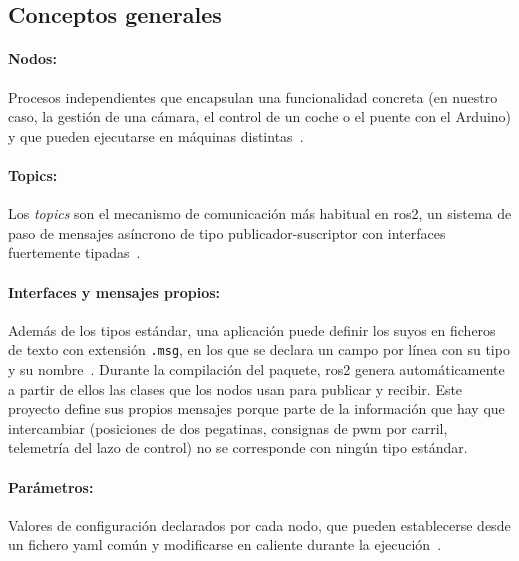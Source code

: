 \subsection{Conceptos generales}
\paragraph{Nodos:}
\label{sec:ros2-nodos}
Procesos independientes que encapsulan una funcionalidad concreta (en nuestro caso, la gestión de una cámara, el control de un coche o el puente con el Arduino) y que pueden ejecutarse en máquinas distintas~\cite{ros2nodes}.

\paragraph{Topics:}
\label{sec:ros2-topics}
Los \emph{topics} son el mecanismo de comunicación más habitual en \gls{ros2}, un sistema de paso de mensajes asíncrono de tipo publicador-suscriptor con interfaces fuertemente tipadas~\cite{macenski2022}. %

\paragraph{Interfaces y mensajes propios:}
\label{sec:ros2-interfaces}
Además de los tipos estándar, una aplicación puede definir los suyos en ficheros de texto con extensión \texttt{.msg}, en los que se declara un campo por línea con su tipo y su nombre~\cite{ros2interfaces}. Durante la compilación del paquete, \gls{ros2} genera automáticamente a partir de ellos las clases que los nodos usan para publicar y recibir. Este proyecto define sus propios mensajes porque parte de la información que hay que intercambiar (posiciones de dos pegatinas, consignas de \gls{pwm} por carril, telemetría del lazo de control) no se corresponde con ningún tipo estándar.

\paragraph{Parámetros:}
\label{sec:ros2-parametros}
Valores de configuración declarados por cada nodo, que pueden establecerse desde un fichero \gls{yaml} común y modificarse en caliente durante la ejecución~\cite{ros2params}.

